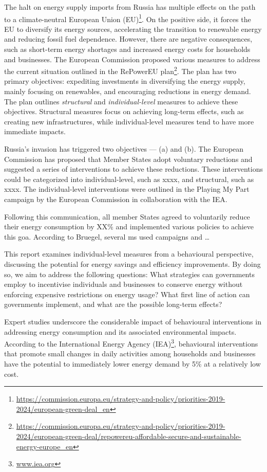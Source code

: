\documentclass[
  11pt,
]{article}
\DeclareRobustCommand{\href}[2]{#2\footnote{\url{#1}}}
\begin{document}
The halt on energy supply imports from Russia has multiple effects on
the path
\href{https://commission.europa.eu/strategy-and-policy/priorities-2019-2024/european-green-deal_en}{to
a climate-neutral European Union (EU)}. On the positive side, it forces
the EU to diversify its energy sources, accelerating the transition to
renewable energy and reducing fossil fuel dependence. However, there are
negative consequences, such as short-term energy shortages and increased
energy costs for households and businesses. The European Commission
proposed various measures to address the current situation outlined in
the
\href{https://commission.europa.eu/strategy-and-policy/priorities-2019-2024/european-green-deal/repowereu-affordable-secure-and-sustainable-energy-europe_en}{RePowerEU
plan}. The plan has two primary objectives: expediting investments in
diversifying the energy supply, mainly focusing on renewables, and
encouraging reductions in energy demand. The plan outlines
\emph{structural} and \emph{individual-level} measures to achieve these
objectives. Structural measures focus on achieving long-term effects,
such as creating new infrastructures, while individual-level measures
tend to have more immediate impacts.

Russia's invasion has triggered two objectives --- (a) and (b). The
European Commission has proposed that Member States adopt voluntary
reductions and suggested a series of interventions to achieve these
reductions. These interventions could be categorized into
individual-level, such as xxxx, and structural, such as xxxx. The
individual-level interventions were outlined in the Playing My Part
campaign by the European Commission in collaboration with the IEA.

Following this communication, all member States agreed to voluntarily
reduce their energy consumption by XX\% and implemented various policies
to achieve this goa. According to Bruegel, several ms used campaigns and
\ldots{}

This report examines individual-level measures from a behavioural
perspective, discussing the potential for energy savings and efficiency
improvements. By doing so, we aim to address the following questions:
What strategies can governments employ to incentivise individuals and
businesses to conserve energy without enforcing expensive restrictions
on energy usage? What first line of action can governments implement,
and what are the possible long-term effects?

Expert studies underscore the considerable impact of behavioural
interventions in addressing energy consumption and its associated
environmental impacts. According to the \href{www.iea.org}{International
Energy Agency (IEA)}, behavioural interventions that promote small
changes in daily activities among households and businesses have the
potential to immediately lower energy demand by 5\% at a relatively low
cost.
\end{document}
